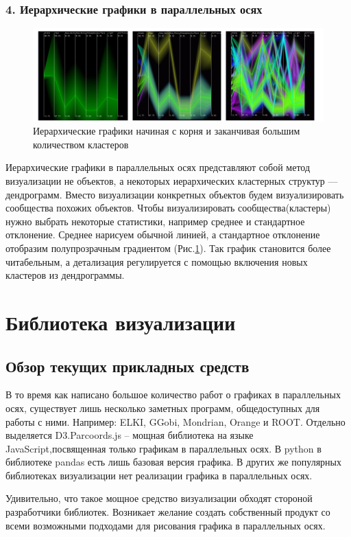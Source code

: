 \documentclass[12pt,fleqn]{article}
\begin{document}
\subsubsection{4. Иерархические графики в параллельных осях}
\begin{figure}[htb]
    \centering
    \includegraphics[width=14cm]{hierarchical.png}
    \caption{Иерархические графики начиная с корня и заканчивая большим количеством кластеров}
    \label{hierarchical_coords}
\end{figure}
Иерархические графики в параллельных осях представляют собой метод визуализации не объектов, а некоторых иерархических
кластерных структур --- дендрограмм. Вместо визуализации конкретных объектов будем
визуализировать сообщества похожих объектов. Чтобы визуализировать сообщества(кластеры)
нужно выбрать некоторые статистики, например среднее и стандартное отклонение. Среднее нарисуем обычной линией, а 
стандартное отклонение отобразим полупрозрачным градиентом (Рис.\ref{hierarchical_coords}).
Так график становится более читабельным, а детализация регулируется с
помощью включения новых кластеров из дендрограммы.

\section{Библиотека визуализации}
\subsection{Обзор текущих прикладных средств}
В то время как написано большое количество работ о графиках в параллельных осях, 
существует лишь несколько заметных программ, общедоступных для работы с ними.
Например: ELKI, GGobi, Mondrian, Orange и ROOT. Отдельно выделяется D3.Parcoords.js -- 
мощная библиотека на языке JavaScript,посвященная только графикам в параллельных осях.
В python в библиотеке pandas есть лишь базовая версия графика. В других же популярных библиотеках
визуализации нет реализации графика в параллельных осях.

Удивительно, что такое мощное средство визуализации обходят стороной разработчики библиотек. 
Возникает желание создать собственный продукт со всеми возможными подходами для рисования графика 
в параллельных осях.
\end{document}
